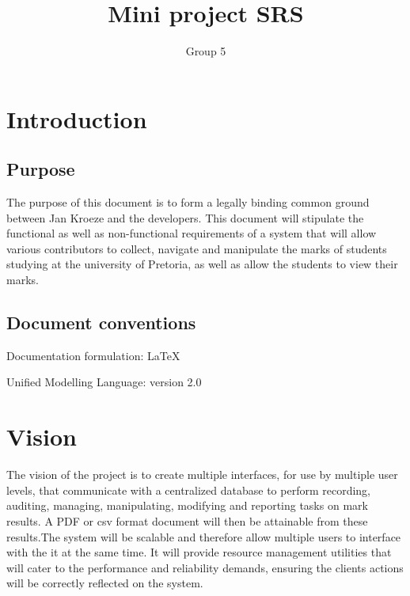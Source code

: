 \documentclass[10pt,a4paper]{article}
\author{Group 5}
\title{Mini project SRS}
\begin{document}
\tableofcontents
\pagebreak
\section{Introduction}

\subsection{Purpose}
The purpose of this document is to form a legally binding common ground between Jan Kroeze and the developers. This document will stipulate the functional as well as non-functional requirements of a system that will allow various contributors to collect, navigate and manipulate the marks of students studying at the university of Pretoria, as well as allow the students to view their marks.

\subsection{Document conventions}
\begin{description}
\item Documentation formulation: LaTeX
\item Unified Modelling Language: version 2.0
\end{description}

\section{Vision}
The vision of the project is to create multiple interfaces, for use by multiple user levels, that communicate with a centralized database to perform recording, auditing, managing, manipulating, modifying and reporting tasks on mark results. A PDF or csv format document will then be attainable from these results.\linebreak The system will be scalable and therefore allow multiple users to interface with the it at the same time. It will provide resource management utilities that will cater to the performance and reliability demands, ensuring the clients actions will be correctly reflected on the system.
\end{document}
